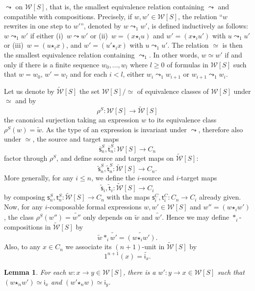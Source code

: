 \documentclass[reqno]{amsart}
\theoremstyle{plain}
\newtheorem{lemma}[subsubsection]{Lemma}
\theoremstyle{definition}
\theoremstyle{remark}
\newcommand{\source}{\mathsf{s}} %
\newcommand{\target}{\mathsf{t}} %
\newcommand{\unit}[1]{1^{#1}} %
\newcommand{\comp}[1]{\ast_{#1}} %
\newcommand{\sce}[1]{\source_{#1}} %
\newcommand{\tge}[1]{\target_{#1}} %
\newcommand{\WW}{\mathcal{W}}
\newcommand{\clWW}{\fcls{\WW}}
\newcommand{\wtx}[1]{\WW[#1]} %
\newcommand{\wtxeq}[1]{\clWW[#1]} %
\newcommand{\formal}[1]{\mathsf{#1}} %
\newcommand{\fid}[1]{\formal{i}_{#1}} %
\newcommand{\fcomp}[1]{\bm{\star}_{#1}} %
\newcommand{\type}[3]{#1:#2\to #3} %
\newcommand{\frel}{\leadsto} %
\newcommand{\cfrel}{\leadsto_1} %
\newcommand{\freq}{\simeq} %
\newcommand{\cans}[1]{\rho^{#1}} %
\newcommand{\fcls}[1]{\widetilde{#1}}%
\newcommand{\scex}[1]{\extend{\source}_{#1}}
\newcommand{\tgex}[1]{\extend{\target}_{#1}}
\newcommand{\scecl}[1]{\fcls{\source}_{#1}}
\newcommand{\tgecl}[1]{\fcls{\target}_{#1}}
\newcommand{\extend}[1]{\overline{#1}} %
\begin{document}
  $\frel$ on $\wtx S$, that is, the smallest equivalence relation containing $\frel$ and compatible with compositions. Precisely, if
  $w,w'\in\wtx S$, the relation  ``$w$ rewrites in one step
  to $w'$'',
  denoted by $w\cfrel w'$, is defined inductively as follows: $w\cfrel
  w'$ if either (i)~$w\frel w'$ or (ii)~$w=(x\fcomp i u)$ and $w'=(x\fcomp i u')$
  with $u\cfrel u'$ or (iii)~$w=(u\fcomp i x)$,
  and $w'=(u'\fcomp i x)$ with $u\cfrel u'$. The relation $\freq$ is
  then the smallest equivalence relation containing $\cfrel$. In other
  words, $w\freq w'$ if and only if there is a finite sequence
  $w_0,...,w_l$ where $l\geq 0$ of formulas in $\wtx S$ such that
  $w=w_0$, $w'=w_l$ and for each $i<l$, either $w_i\cfrel w_{i+1}$ or
  $w_{i+1}\cfrel w_i$.

  Let us denote by $\wtxeq S$
  the set $\wtx S/\!\!\freq$ of equivalence classes of $\wtx S$ under
  $\freq$ and by
  \[\cans S: \wtx S\to \wtxeq S\]
  the canonical surjection taking an expression $w$ to its
  equivalence class $\cans S(w)=\fcls w$. As the type of an
  expression is invariant under $\frel$, therefore also under $\freq$, 
 the source and target maps
  \[\scex n^S,\tgex n^S:\wtx S\to C_n\]
  factor through $\cans S$, and define source and target maps on $\wtxeq S$:
  \[\scecl n^S,\tgecl n^S:\wtxeq S\to C_n.\]
  More generally, for any $i\leq n$, we define the $i$-source and
  $i$-target maps
  \[\scecl i,\tgecl i:\wtxeq S\to C_i\]
  by composing $\sce n^S,\tge n^S:\wtxeq S\to C_n$ with the maps $\sce i^C,\tge
  i^C:C_n\to C_i$ already given. Now, for any $i$-composable formal expressions
  $w,w'\in \wtx S$ and $w''=(w\fcomp i w')$, the class $\cans S(w'')=\fcls{w''}$ only
  depends on $\fcls w$ and $\fcls{w'}$. Hence we may define 
 $\comp i$-compositions in $\wtxeq S$ by
 \[\fcls{w}\comp i\fcls{w'}=\fcls{(w\fcomp i w')}.\]
 Also, to any $x\in C_n$ we associate its $(n{+}1)$-unit in $\wtxeq
  S$ by
  \[\unit{n+1}(x)=\fcls{\fid x}.\]
  \begin{lemma}\label{lemma:inv}
    For each $\type wxy\in \wtx S$, there is a $\type{w'}yx\in \wtx S$
    such that $(w\fcomp n w')\freq\fid x$ and $(w'\fcomp n w)\freq
    \fid y$.
  \end{lemma}
\end{document}
